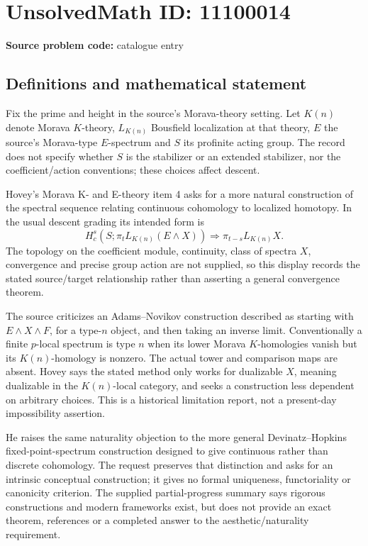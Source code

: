 \documentclass[11pt]{article}
\begin{document}
\section*{UnsolvedMath ID: 11100014}
\textbf{Source problem code:} catalogue entry
\subsection{Definitions and mathematical statement}
Fix the prime and height in the source's Morava-theory setting. Let \(K(n)\) denote Morava \(K\)-theory, \(L_{K(n)}\) Bousfield localization at that theory, \(E\) the source's Morava-type \(E\)-spectrum and \(S\) its profinite acting group. The record does not specify whether \(S\) is the stabilizer or an extended stabilizer, nor the coefficient/action conventions; these choices affect descent.

Hovey's Morava K- and E-theory item 4 asks for a more natural construction of the spectral sequence relating continuous cohomology to localized homotopy. In the usual descent grading its intended form is
\[
 H_c^s\!\left(S;\pi_t L_{K(n)}(E\wedge X)\right)
       \Longrightarrow \pi_{t-s}L_{K(n)}X.
\]
The topology on the coefficient module, continuity, class of spectra \(X\), convergence and precise group action are not supplied, so this display records the stated source/target relationship rather than asserting a general convergence theorem.

The source criticizes an Adams--Novikov construction described as starting with \(E\wedge X\wedge F\), for a type-\(n\) object, and then taking an inverse limit. Conventionally a finite \(p\)-local spectrum is type \(n\) when its lower Morava \(K\)-homologies vanish but its \(K(n)\)-homology is nonzero. The actual tower and comparison maps are absent. Hovey says the stated method only works for dualizable \(X\), meaning dualizable in the \(K(n)\)-local category, and seeks a construction less dependent on arbitrary choices. This is a historical limitation report, not a present-day impossibility assertion.

He raises the same naturality objection to the more general Devinatz--Hopkins fixed-point-spectrum construction designed to give continuous rather than discrete cohomology. The request preserves that distinction and asks for an intrinsic conceptual construction; it gives no formal uniqueness, functoriality or canonicity criterion. The supplied partial-progress summary says rigorous constructions and modern frameworks exist, but does not provide an exact theorem, references or a completed answer to the aesthetic/naturality requirement.
\end{document}
